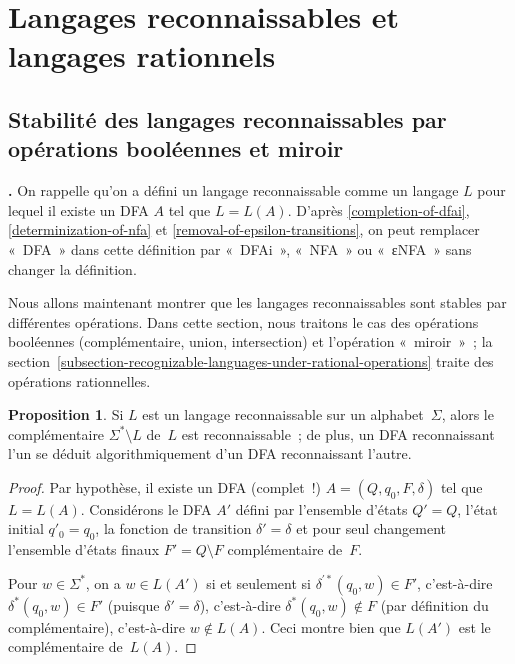 \documentclass[12pt,a4paper]{article}
\theoremstyle{definition}
\newcommand\thingy{%
\refstepcounter{comcnt}\medskip\noindent\textbf{\thecomcnt.} }
\newtheorem{prop}[comcnt]{Proposition}
\begin{document}
\section{Langages reconnaissables et langages rationnels}\label{section-recognizable-languages}

\subsection{Stabilité des langages reconnaissables par opérations booléennes et miroir}

\thingy On rappelle qu'on a défini un langage reconnaissable comme un langage $L$ pour lequel il existe
un DFA $A$ tel que $L = L(A)$.  D'après \ref{completion-of-dfai},
\ref{determinization-of-nfa} et \ref{removal-of-epsilon-transitions},
on peut remplacer « DFA » dans cette définition par « DFAi », « NFA »
ou « εNFA » sans changer la définition.

\smallskip

Nous allons maintenant montrer que les langages reconnaissables sont
stables par différentes opérations.  Dans cette section, nous traitons
le cas des opérations booléennes (complémentaire, union, intersection)
et l'opération « miroir » ; la
section \ref{subsection-recognizable-languages-under-rational-operations}
traite des opérations rationnelles.

\begin{prop}\label{dfa-complement}
Si $L$ est un langage reconnaissable sur un alphabet $\Sigma$, alors
le complémentaire $\Sigma^*\setminus L$ de $L$ est reconnaissable ; de
plus, un DFA reconnaissant l'un se déduit algorithmiquement d'un DFA
reconnaissant l'autre.
\end{prop}
\begin{proof}
Par hypothèse, il existe un DFA (complet !) $A = (Q,q_0,F,\delta)$ tel
que $L = L(A)$.  Considérons le DFA $A'$ défini par l'ensemble d'états
$Q' = Q$, l'état initial $q'_0 = q_0$, la fonction de transition
$\delta' = \delta$ et pour seul changement l'ensemble d'états finaux
$F' = Q \setminus F$ complémentaire de $F$.

Pour $w \in \Sigma^*$, on a $w \in L(A')$ si et seulement si
$\delta^{\prime*}(q_0,w) \in F'$, c'est-à-dire $\delta^*(q_0,w) \in
F'$ (puisque $\delta' = \delta$), c'est-à-dire $\delta^*(q_0,w)
\not\in F$ (par définition du complémentaire), c'est-à-dire $w \not\in
L(A)$.  Ceci montre bien que $L(A')$ est le complémentaire de $L(A)$.
\end{proof}
\end{document}
